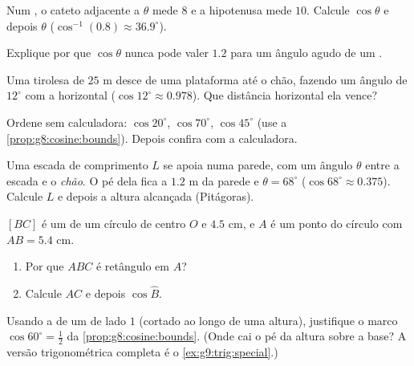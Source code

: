 \begin{exercise}[$\star$]\label{exo:g8:cosine:5}
Num , o cateto adjacente a $\theta$ mede $8$ e a
hipotenusa mede $10$. Calcule $\cos\theta$ e depois $\theta$
($\cos^{-1}(0.8) \approx 36.9^\circ$).
\end{exercise}

\begin{exercise}[$\star$]\label{exo:g8:cosine:6}
Explique por que $\cos\theta$ nunca pode valer $1.2$ para um ângulo
agudo de um .
\end{exercise}

\begin{exercise}[$\star\star$]\label{exo:g8:cosine:7}
Uma tirolesa de $25$ m desce de uma plataforma até o chão, fazendo um
ângulo de $12^\circ$ com a horizontal
($\cos 12^\circ \approx 0.978$). Que distância horizontal ela vence?
\end{exercise}

\begin{exercise}[$\star\star$]\label{exo:g8:cosine:8}
Ordene sem calculadora: $\cos 20^\circ$, $\cos 70^\circ$,
$\cos 45^\circ$ (use a \cref{prop:g8:cosine:bounds}). Depois confira
com a calculadora.
\end{exercise}

\begin{exercise}[$\star\star$]\label{exo:g8:cosine:9}
Uma escada de comprimento $L$ se apoia numa parede, com um ângulo
$\theta$ entre a escada e o \emph{chão}. O pé dela fica a $1.2$ m da
parede e $\theta = 68^\circ$ ($\cos 68^\circ \approx 0.375$). Calcule
$L$ e depois a altura alcançada (Pitágoras).
\end{exercise}

\begin{exercise}[$\star\star$]\label{exo:g8:cosine:10}
$[BC]$ é um  de um círculo de centro $O$ e  $4.5$ cm, e
$A$ é um ponto do círculo com $AB = 5.4$ cm.
\begin{enumerate}
  \item Por que $ABC$ é retângulo em $A$?
  \item Calcule $AC$ e depois $\cos \widehat B$.
\end{enumerate}
\end{exercise}

\begin{exercise}[$\star\star\star$]\label{exo:g8:cosine:11}
Usando a  de um  de lado $1$ (cortado ao
longo de uma altura), justifique o marco $\cos 60^\circ = \frac12$ da
\cref{prop:g8:cosine:bounds}. (Onde cai o pé da altura sobre a base? A
versão trigonométrica completa é o \cref{ex:g9:trig:special}.)
\end{exercise}

